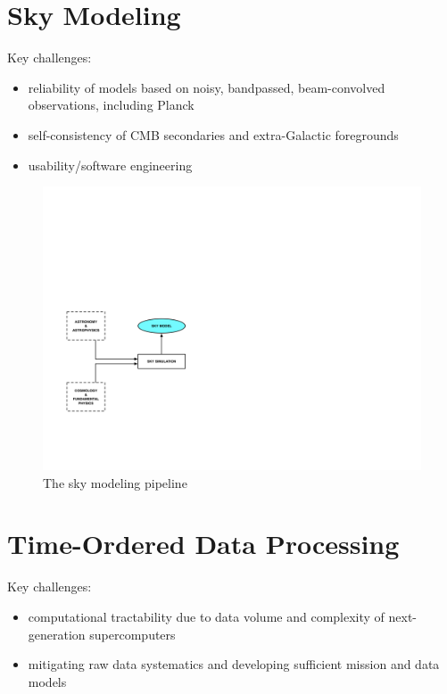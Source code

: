 \newpage

\section{Sky Modeling}

Key challenges: 
\begin{itemize} 
\item reliability of models based on noisy, bandpassed, beam-convolved observations, including Planck
\item self-consistency of CMB secondaries and extra-Galactic foregrounds
\item usability/software engineering
\end{itemize} 

\begin{figure}[htbp]
\centering
\includegraphics[width=1\textwidth]{Analysis/sm}
\caption{The sky modeling pipeline}
\label{default}

\end{figure}

\newpage

\section{Time-Ordered Data Processing}

Key challenges:
\begin{itemize}
\item computational tractability due to data volume and complexity of next-generation supercomputers
\item mitigating raw data systematics and developing sufficient mission and data models
\end{itemize}

